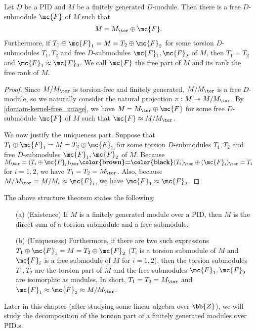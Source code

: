 \begin{cor}\label{decomposition of f.g. modules over pids}
    Let $D$ be a PID and $M$ be a finitely generated $D$-module.
    Then there is a free $D$-submodule $\mc{F}$ of $M$ such that
    \begin{align*}
        M=M_\tor\oplus\mc{F}.
    \end{align*}
    Furthermore, if $T_1\oplus\mc{F}_1=M=T_2\oplus\mc{F}_2$ for some torsion $D$-submodules $T_1, T_2$ and free $D$-submodules $\mc{F}_1, \mc{F}_2$ of $M$, then $T_1=T_2$ and $\mc{F}_1\approx\mc{F}_2$.
    We call $\mc{F}$ the free part of $M$ and its rank the free rank of $M$.
\end{cor}
\begin{proof}
    Since $M/M_\tor$ is torsion-free and finitely generated, $M/M_\tor$ is a free $D$-module, so we naturally consider the natural projection $\pi: M\twoheadrightarrow M/M_\tor$.
    By \cref{domain-kernel-free_image}, we have $M=M_\tor\oplus\mc{F}$ for some free $D$-submodule $\mc{F}$ of $M$ such that $\mc{F}\approx M/M_\tor$.

    We now justify the uniqueness part.
    Suppose that $T_1\oplus\mc{F}_1=M=T_2\oplus\mc{F}_2$ for some torsion $D$-submodules $T_1, T_2$ and free $D$-submodules $\mc{F}_1, \mc{F}_2$ of $M$.
    Because $M_\tor=(T_i\oplus\mc{F}_i)_\tor\textbf{\color{brown}=\color{black}}(T_i)_\tor\oplus(\mc{F}_i)_\tor=T_i$ for $i=1, 2$, we have $T_1=T_2=M_\tor$.
    Also, because $M/M_\tor=M/M_i\approx\mc{F}_i$, we have $\mc{F}_1\approx\mc{F}_2$.
\end{proof}
\begin{rmk}
    The above structure theorem states the following:
    \begin{enumerate}
        \item[(a)]
        {
            (Existence)
            If $M$ is a finitely generated module over a PID, then $M$ is the direct sum of a torsion submodule and a free submodule.
        }
        \item[(b)]
        {
            (Uniqueness)
            Furthermore, if there are two such expressions $T_1\oplus\mc{F}_1=M=T_2\oplus\mc{F}_2$ ($T_i$ is a torsion submodule of $M$ and $\mc{F}_i$ is a free submodule of $M$ for $i=1, 2$), then the torsion submodules $T_1, T_2$ are the torsion part of $M$ and the free submodules $\mc{F}_1, \mc{F}_2$ are isomorphic as modules.
            In short, $T_1=T_2=M_\tor$ and $\mc{F}_1\approx\mc{F}_2\approx M/M_\tor$.
        }
    \end{enumerate}
    Later in this chapter (after studying some linear algebra over $\bb{Z}$), we will study the decomposition of the torsion part of a finitely generated modules over PID.s.
\end{rmk}

